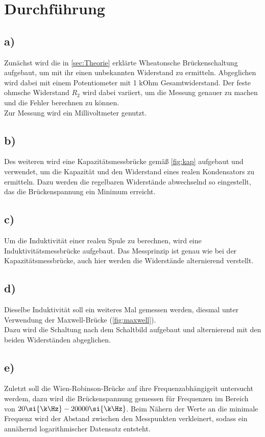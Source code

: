 \section{Durchführung}
\label{sec:Durchführung}

\subsection{a) }
    Zunächst wird die in \ref{sec:Theorie} erklärte Wheatonsche Brückenschaltung aufgebaut, um mit ihr einen unbekannten Widerstand zu ermitteln. 
    Abgeglichen wird dabei mit einem Potentiometer mit 1 kOhm Gesamtwiderstand. Der feste ohmsche Widerstand $R_2$ wird dabei variiert, um die 
    Messung genauer zu machen und die Fehler berechnen zu können.\\
    Zur Messung wird ein Millivoltmeter genutzt.

\subsection{b) }
    Des weiteren wird eine Kapazitätsmessbrücke gemäß \ref{fig:kap} aufgebaut und verwendet, um die Kapazität und den Widerstand eines realen
    Kondensators zu ermitteln. Dazu werden die regelbaren Widerstände abwechselnd so eingestellt, das die Brückenspannung ein Minimum erreicht.

\subsection{c) }
    Um die Induktivität einer realen Spule zu berechnen, wird eine Induktivitätsmessbrücke aufgebaut. Das Messprinzip ist genau wie bei der Kapazitätsmessbrücke,
    auch hier werden die Widerstände alternierend verstellt.

\subsection{d) }
    Dieselbe Induktivität soll ein weiteres Mal gemessen werden, diesmal unter Verwendung der Maxwell-Brücke (\ref{fig:maxwell}).\\
    Dazu wird die Schaltung nach dem Schaltbild aufgebaut und alternierend mit den beiden Widerständen abgeglichen.

\subsection{e) }
    Zuletzt soll die Wien-Robinson-Brücke auf ihre Frequenzabhängigeit untersucht werdem, dazu wird die Brückenspannung gemessen für Frequenzen im Bereich 
    von $20 \si{\k\Hz} - 20 000 \si{\k\Hz}$. Beim Nähern der Werte an die minimale Frequenz wird der Abstand zwischen den Messpunkten verkleinert, sodass 
    ein annähernd logarithmischer Datensatz entsteht.